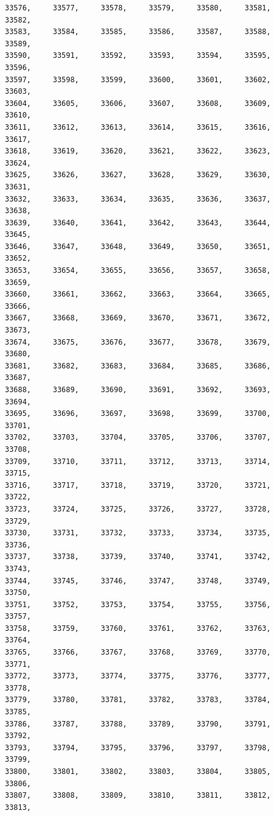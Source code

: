 \documentclass[a4paper,11pt]{report}
\begin{document}
\begin{verbatim}
33576,     33577,     33578,     33579,     33580,     33581,     33582,     
33583,     33584,     33585,     33586,     33587,     33588,     33589,     
33590,     33591,     33592,     33593,     33594,     33595,     33596,     
33597,     33598,     33599,     33600,     33601,     33602,     33603,     
33604,     33605,     33606,     33607,     33608,     33609,     33610,     
33611,     33612,     33613,     33614,     33615,     33616,     33617,     
33618,     33619,     33620,     33621,     33622,     33623,     33624,     
33625,     33626,     33627,     33628,     33629,     33630,     33631,     
33632,     33633,     33634,     33635,     33636,     33637,     33638,     
33639,     33640,     33641,     33642,     33643,     33644,     33645,     
33646,     33647,     33648,     33649,     33650,     33651,     33652,     
33653,     33654,     33655,     33656,     33657,     33658,     33659,     
33660,     33661,     33662,     33663,     33664,     33665,     33666,     
33667,     33668,     33669,     33670,     33671,     33672,     33673,     
33674,     33675,     33676,     33677,     33678,     33679,     33680,     
33681,     33682,     33683,     33684,     33685,     33686,     33687,     
33688,     33689,     33690,     33691,     33692,     33693,     33694,     
33695,     33696,     33697,     33698,     33699,     33700,     33701,     
33702,     33703,     33704,     33705,     33706,     33707,     33708,     
33709,     33710,     33711,     33712,     33713,     33714,     33715,     
33716,     33717,     33718,     33719,     33720,     33721,     33722,     
33723,     33724,     33725,     33726,     33727,     33728,     33729,     
33730,     33731,     33732,     33733,     33734,     33735,     33736,     
33737,     33738,     33739,     33740,     33741,     33742,     33743,     
33744,     33745,     33746,     33747,     33748,     33749,     33750,     
33751,     33752,     33753,     33754,     33755,     33756,     33757,     
33758,     33759,     33760,     33761,     33762,     33763,     33764,     
33765,     33766,     33767,     33768,     33769,     33770,     33771,     
33772,     33773,     33774,     33775,     33776,     33777,     33778,     
33779,     33780,     33781,     33782,     33783,     33784,     33785,     
33786,     33787,     33788,     33789,     33790,     33791,     33792,     
33793,     33794,     33795,     33796,     33797,     33798,     33799,     
33800,     33801,     33802,     33803,     33804,     33805,     33806,     
33807,     33808,     33809,     33810,     33811,     33812,     33813,     

\end{verbatim}
\end{document}
